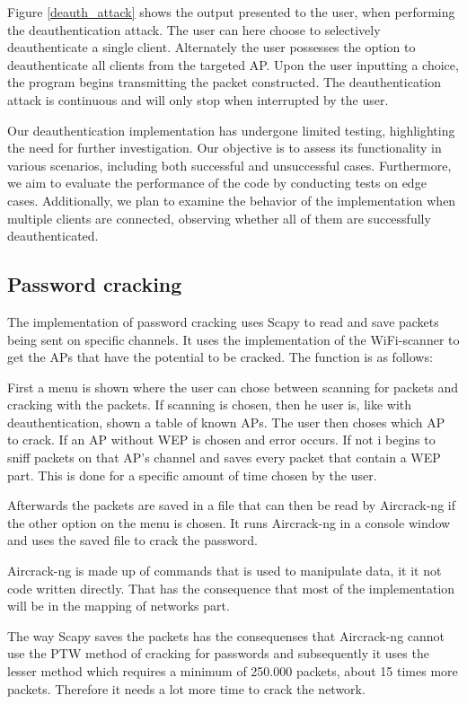 Figure \ref{deauth_attack} shows the output presented to the user, when performing the deauthentication attack. The user can here choose to selectively deauthenticate a single client. Alternately the user possesses the option to deauthenticate all clients from the targeted AP. Upon the user inputting a choice, the program begins transmitting the packet constructed. The deauthentication attack is continuous and will only stop when interrupted by the user. 

Our deauthentication implementation has undergone limited testing, highlighting the need for further investigation. Our objective is to assess its functionality in various scenarios, including both successful and unsuccessful cases. Furthermore, we aim to evaluate the performance of the code by conducting tests on edge cases. Additionally, we plan to examine the behavior of the implementation when multiple clients are connected, observing whether all of them are successfully deauthenticated. 


\subsection{Password cracking}
The implementation of password cracking uses Scapy to read and save packets being sent on specific channels. It uses the implementation of the WiFi-scanner to get the APs that have the potential to be cracked. The function is as follows:

First a menu is shown where the user can chose between scanning for packets and cracking with the packets. If scanning is chosen, then he user is, like with deauthentication, shown a table of known APs. The user then choses which AP to crack. If an AP without WEP is chosen and error occurs. If not i begins to sniff packets on that AP's channel and saves every packet that contain a WEP part. This is done for a specific amount of time chosen by the user. 

Afterwards the packets are saved in a file that can then be read by Aircrack-ng if the other option on the menu is chosen. It runs Aircrack-ng in a console window and uses the saved file to crack the password. 

Aircrack-ng is made up of commands that is used to manipulate data, it it not code written directly. That has the consequence that most of the implementation will be in the mapping of networks part. 

The way Scapy saves the packets has the consequenses that Aircrack-ng cannot use the PTW method of cracking for passwords and subsequently it uses the lesser method which requires a minimum of 250.000 packets, about 15 times more packets. Therefore it needs a lot more time to crack the network. 


